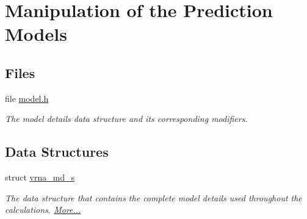 \hypertarget{group__model__details}{}\section{Manipulation of the Prediction Models}
\label{group__model__details}
\subsection*{Files}
\begin{DoxyCompactItemize}
\item 
file \hyperlink{model_8h}{model.\+h}
\begin{DoxyCompactList}\small\item\em The model details data structure and its corresponding modifiers. \end{DoxyCompactList}\end{DoxyCompactItemize}
\subsection*{Data Structures}
\begin{DoxyCompactItemize}
\item 
struct \hyperlink{group__model__details_structvrna__md__s}{vrna\+\_\+md\+\_\+s}
\begin{DoxyCompactList}\small\item\em The data structure that contains the complete model details used throughout the calculations.  \hyperlink{group__model__details_structvrna__md__s}{More...}\end{DoxyCompactList}\end{DoxyCompactItemize}
